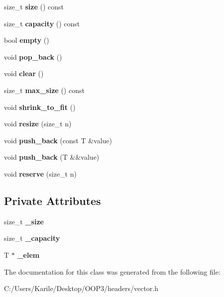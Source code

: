 \begin{DoxyCompactItemize}
size\+\_\+t {\bfseries size} () const
\item 
\mbox{\label{class_vector_a85c39fed5822d2a03a3250336039c933}} 
size\+\_\+t {\bfseries capacity} () const
\item 
\mbox{\label{class_vector_abc020404c26eb6bf465cda91ad543c17}} 
bool {\bfseries empty} ()
\item 
\mbox{\label{class_vector_adcba035109febbe55cba2a25f8483ba6}} 
void {\bfseries pop\+\_\+back} ()
\item 
\mbox{\label{class_vector_a32ad98b135472b0ebc5d6cb3ae5d0085}} 
void {\bfseries clear} ()
\item 
\mbox{\label{class_vector_a442b72c70b33b62d49c99845385bba51}} 
size\+\_\+t {\bfseries max\+\_\+size} () const
\item 
\mbox{\label{class_vector_ad6454ce193263b8000d4c18cb0c3a0c8}} 
void {\bfseries shrink\+\_\+to\+\_\+fit} ()
\item 
\mbox{\label{class_vector_a3d9b6e626fb164db0112dddcdba6c2de}} 
void {\bfseries resize} (size\+\_\+t n)
\item 
\mbox{\label{class_vector_a4415960a83615855ec32f8169f641786}} 
void {\bfseries push\+\_\+back} (const T \&value)
\item 
\mbox{\label{class_vector_a7e9c3a4530e85fd3490d932846307683}} 
void {\bfseries push\+\_\+back} (T \&\&value)
\item 
\mbox{\label{class_vector_a4b0f3d561c3be42d558180814b8fc50d}} 
void {\bfseries reserve} (size\+\_\+t n)
\end{DoxyCompactItemize}
\subsection*{Private Attributes}
\begin{DoxyCompactItemize}
\item 
\mbox{\label{class_vector_a54c41dd05f6505c48b961e80d05f8052}} 
size\+\_\+t {\bfseries \+\_\+size}
\item 
\mbox{\label{class_vector_a7ee25115155f01b71cc0dbd43907176b}} 
size\+\_\+t {\bfseries \+\_\+capacity}
\item 
\mbox{\label{class_vector_a2a0290969bd4070373689ad5ec7473f2}} 
T $\ast$ {\bfseries \+\_\+elem}
\end{DoxyCompactItemize}


The documentation for this class was generated from the following file\+:\begin{DoxyCompactItemize}
\item 
C\+:/\+Users/\+Karile/\+Desktop/\+O\+O\+P3/headers/vector.\+h\end{DoxyCompactItemize}
